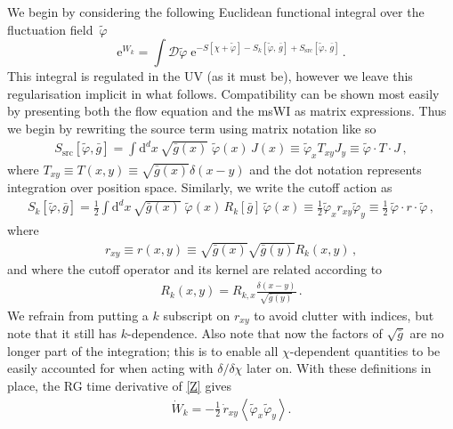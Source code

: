 \documentclass[11pt,draft]{book} %
\begin{document}
We begin by considering the following Euclidean functional integral over the fluctuation field~$\tilde\varphi$
\begin{equation}
  \mathrm e^{W_k} = \int \mathcal{D}\tilde\varphi \;
  \mathrm e^{-S[\chi+\tilde\varphi]-S_k[\tilde\varphi,\, \bar g]
  + S_{\mathrm{src}}[\tilde\varphi, \, \bar g]} \,.
  \label{Z}
\end{equation}
This integral is regulated in the UV (as it must be), however we leave this regularisation implicit
in what follows. Compatibility can be shown most easily by presenting both the flow equation and the
msWI as matrix expressions. Thus we begin by rewriting the source term using matrix notation like so
\begin{align}
	S_\mathrm{src}[\tilde\varphi,\bar g] = \int \mathrm d^d x \, \sqrt{\bar g(x)} \;
  \tilde\varphi(x) \, J(x)
  \equiv \tilde\varphi_xT_{xy}J_y
  \equiv \tilde\varphi\cdot T\cdot J \,,
\end{align}
where $T_{xy}\equiv T(x,y)\equiv\sqrt{\bar g(x)}\delta(x-y)$ and the dot notation represents integration over position space.  Similarly, we write the cutoff action as
\begin{align}
  S_k[\tilde\varphi, \bar g] = \frac{1}{2} \int \mathrm d^d x \, \sqrt{\bar g(x)} \;
  \tilde\varphi(x) \, R_k[\bar g] \, \tilde\varphi(x)
  \equiv \frac{1}{2}\tilde\varphi_x r_{xy} \tilde\varphi_{y}
  \equiv\frac{1}{2}\,\tilde\varphi\cdot r \cdot\tilde\varphi \,,
  \label{cutoff-action}
\end{align}
where
\begin{align}
  r_{xy}\equiv r(x,y)\equiv\sqrt{\bar g(x)}\sqrt{\bar g(y)}R_{k}(x,y)\,,
  \label{odd-r}
\end{align}
and where the cutoff operator and its kernel are related according to
\begin{align}
	R_k(x,y) = R_{k,x}\frac{\delta(x-y)}{\sqrt{\bar g(y)}} \,.
\end{align}
We refrain from putting a $k$ subscript on $r_{xy}$ to avoid clutter with indices,
but note that it still has $k$-dependence. Also note that now the factors of $\sqrt{\bar g}$ are no
longer part of the integration; this is to enable all $\chi$-dependent quantities to be easily accounted
for when acting with $\delta/\delta\chi$ later on.
With these definitions in place, the RG time derivative of \eqref{Z} gives
\begin{align}
	\dot W_k = -\frac{1}{2} \, \dot r_{xy} \left<\tilde\varphi_x \tilde\varphi_y \right>.
	\label{W_flow}
\end{align}
\end{document}
